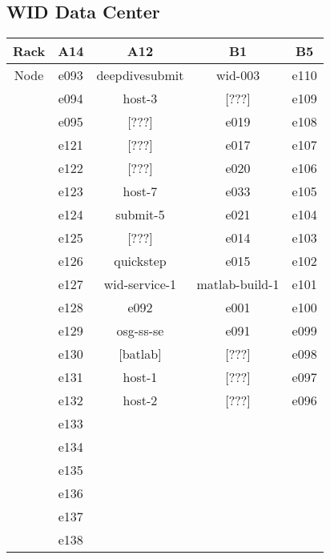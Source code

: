 \documentclass[10pt,letterpaper]{article}
\begin{document}
    \subsection{WID Data Center}
        \begin{center}
        \begin{tabular}{ |c|c|c|c|c|}
        \hline
        Rack & A14 & A12 & B1 & B5 \\
        \hline
        \multirow{1}{3em}{Node}

        & e093  & deepdivesubmit & wid-003        & e110 \\
        & e094  & host-3         & [???]          & e109 \\
        & e095  & [???]          & e019           & e108 \\
        & e121  & [???]          & e017           & e107 \\
        & e122  & [???]          & e020           & e106 \\
        & e123  & host-7         & e033           & e105 \\
        & e124  & submit-5       & e021           & e104 \\
        & e125  & [???]          & e014           & e103 \\
        & e126  & quickstep      & e015           & e102 \\
        & e127  & wid-service-1  & matlab-build-1 & e101 \\
        & e128  & e092           & e001           & e100 \\
        & e129  & osg-ss-se      & e091           & e099 \\
        & e130  & [batlab]       & [???]          & e098 \\
        & e131  & host-1         & [???]          & e097 \\
        & e132  & host-2         & [???]          & e096 \\
        & e133  &                &                &      \\
        & e134  &                &                &      \\
        & e135  &                &                &      \\
        & e136  &                &                &      \\
        & e137  &                &                &      \\
        & e138  &                &                &      \\

\end{tabular}
\end{center}
\end{document}
